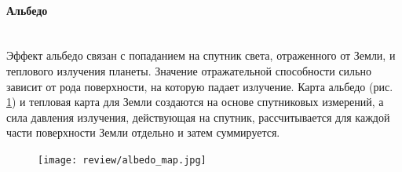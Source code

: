 \paragraph{Альбедо} \mbox{} \\

Эффект альбедо связан с попаданием на спутник света, отраженного от Земли, и теплового излучения планеты.
Значение отражательной способности сильно зависит от рода поверхности, на которую падает излучение.
Карта альбедо (рис. \ref{fig:albedo_map}) и тепловая карта для Земли создаются на основе спутниковых измерений, а сила давления излучения,
действующая на спутник, рассчитывается для каждой части поверхности Земли отдельно и затем суммируется.

\begin{figure}[h!]
    \centering
    \texttt{[image: review/albedo\_map.jpg]}
    \label{fig:albedo_map}
\end{figure}